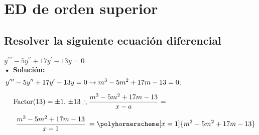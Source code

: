 \documentclass[letterpaper, 12pt]{article}
\begin{document}
\thispagestyle{fancy}
\section*{ED de orden superior}
\subsection*{Resolver la siguiente ecuación diferencial}
\justify
{\large \centering
\(y^{\prime\prime\prime}-5y^{\prime\prime}+17y^{\prime}-13y=0\)\\
}
\justify
{\large \textbf{• Solución:}
\begin{equation*}
    \begin{aligned}
        y^{\prime\prime\prime}-5y^{\prime\prime}+17y^{\prime}-13y=0&\rightarrow m^3-5m^2+17m-13=0; \\[5pt]
        \text{Factor}(13)= \pm 1,\, \pm 13 \therefore &\:\frac{m^3-5m^2+17m-13}{x-a}=\\[5pt]
        \frac{m^3-5m^2+17m-13}{x-1}\:&=\polyhornerscheme[x=1] {m^3-5m^2+17m-13}
    \end{aligned}
\end{equation*}}
\end{document}

